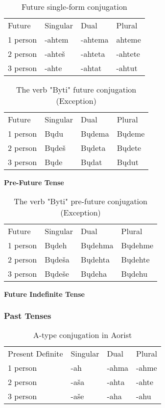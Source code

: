 \begin{table}[!htb]
	\caption{Future single-form conjugation}
	\begin{tabular}{llll}
		Future
		& Singular
		& Dual
		& Plural \\
		1 person & -ahtem & -ahtema & ahteme \\
		2 person & -ahteš & -ahteta & -ahtete \\
		3 person & -ahte & -ahtat & -ahtut
	\end{tabular}
\end{table}

\begin{table}[!htb]
	\caption{The verb "Byti" future conjugation (Exception)}
	\begin{tabular}{llll}
		Future
		& Singular
		& Dual
		& Plural \\
		1 person & Bųdu & Bųdema & Bųdeme \\
		2 person & Bųdeš & Bųdeta & Bųdete \\
		3 person & Bųde & Bųdat & Bųdut
	\end{tabular}
\end{table}

\textbf{Pre-Future Tense}

\begin{table}[!htb]
	\caption{The verb "Byti" pre-future conjugation (Exception)}
	\begin{tabular}{llll}
		Future
		& Singular
		& Dual
		& Plural \\
		1 person & Bųdeh & Bųdehma & Bųdehme \\
		2 person & Bųdeša & Bųdehta & Bųdehte \\
		3 person & Bųdeše & Bųdeha & Bųdehu
	\end{tabular}
\end{table}

\textbf{Future Indefinite Tense}

\subsubsection{Past Tenses}

\begin{table}[!htb]
	\caption{A-type conjugation in Aorist}
	\begin{tabular}{llll}
		Present Definite & Singular & Dual & Plural \\
		1 person & -ah & -ahma & -ahme \\
		2 person & -aša & -ahta & -ahte \\
		3 person & -aše & -aha & -ahu
	\end{tabular}
\end{table}

